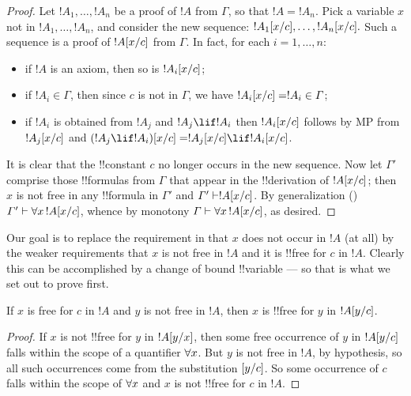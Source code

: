 \documentclass[../../include/open-logic-section]{subfiles}
\begin{document}
\begin{proof} Let $!A_1,\ldots,!A_n$ be a proof of $!A$ from $\Gamma$, so
that $!A=!A_n$. Pick a variable $x$ not in $!A_1,\ldots,!A_n$, and consider
the new sequence: $!A_1[x/c],\ldots,!A_n[x/c].$ Such a
sequence is a proof of $!A[x/c]$ from $\Gamma$. In fact, for each
$i=1,\ldots,n$: \begin{itemize} \item if $!A$ is an axiom, then so is
$!A_i[x/c]$; \item if $!A_i \in \Gamma$, then since $c$ is not in
$\Gamma$, we have $!A_i[x/c] = !A_i \in \Gamma$; \item if $!A_i$
is obtained from $!A_j$ and $!A_j \lif !A_i$ then $!A_i[x/c]$
follows by MP from $!A_j[x/c]$ and $\Subst{(!A_j \lif !A_i)}{x}{c}
= \Subst{!A_j}{x}{c} \lif \Subst{!A_i}{x}{c}$. \end{itemize} It is clear
that the !!{constant} $c$ no longer occurs in the new sequence. Now let
$\Gamma'$ comprise those !!{formula}s from $\Gamma$ that appear in the
!!{derivation} of $!A[x/c]$; then $x$ is not free in any
!!{formula} in $\Gamma'$ and $\Gamma' \Proves \Subst{!A}{x}{c}$. By
generalization () $\Gamma'
\Proves \lforall[x][\Subst{!A}{x}{c}]$, whence by monotony $\Gamma \Proves
\lforall[x][\Subst{!A}{x}{c}]$, as desired. 
\end{proof}

\begin{explain}
Our goal is to replace the requirement in  that $x$
does not occur in $!A$ (at all) by the weaker requirements that $x$ is
not free in $!A$ and it is !!{free for} $c$ in $!A$. Clearly this can
be accomplished by a change of bound !!{variable} --- so that is what
we set out to prove first.
\end{explain}

\begin{lem}
If $x$ is free for $c$ in $!A$ and $y$ is not free in $!A$, then $x$
is !!{free for} $y$ in $!A[y/c]$.
\end{lem}

\begin{proof} If $x$ is not !!{free for} $y$ in $!A[y/x]$, then
some free occurrence of $y$ in $!A[y/c]$ falls within the scope of
a quantifier $\lforall[x]$. But $y$ is not free in $!A$, by hypothesis, so
all such occurrences come from the substitution $[y/c]$. So some
occurrence of $c$ falls within the scope of $\lforall[x]$ and $x$ is not
!!{free for} $c$ in $!A$. 
\end{proof}
\end{document}
